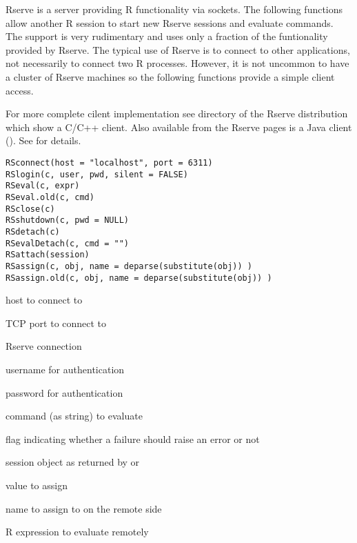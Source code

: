 \begin{Description}\relax
Rserve is a server providing R functionality via sockets. The
following functions allow another R session to start new Rserve
sessions and evaluate commands. The support is very rudimentary and
uses only a fraction of the funtionality provided by Rserve. The
typical use of Rserve is to connect to other applications, not
necessarily to connect two R processes. However, it is not uncommon to
have a cluster of Rserve machines so the following functions provide a
simple client access.

For more complete cilent implementation see 
directory of the Rserve distribution which show a C/C++ client. Also
available from the Rserve pages is a Java client
(). See  for details.
\end{Description}
\begin{Usage}
\begin{verbatim}
RSconnect(host = "localhost", port = 6311)
RSlogin(c, user, pwd, silent = FALSE)
RSeval(c, expr)
RSeval.old(c, cmd)
RSclose(c)
RSshutdown(c, pwd = NULL)
RSdetach(c)
RSevalDetach(c, cmd = "")
RSattach(session)
RSassign(c, obj, name = deparse(substitute(obj)) )
RSassign.old(c, obj, name = deparse(substitute(obj)) )
\end{verbatim}
\end{Usage}
\begin{Arguments}
\begin{ldescription}
\item[\code{host}] host to connect to
\item[\code{port}] TCP port to connect to
\item[\code{c}] Rserve connection
\item[\code{user}] username for authentication
\item[\code{pwd}] password for authentication
\item[\code{cmd}] command (as string) to evaluate
\item[\code{silent}] flag indicating whether a failure should raise an error
or not
\item[\code{session}] session object as returned by  or
\item[\code{obj}] value to assign
\item[\code{name}] name to assign to on the remote side
\item[\code{expr}] R expression to evaluate remotely
\end{ldescription}
\end{Arguments}
